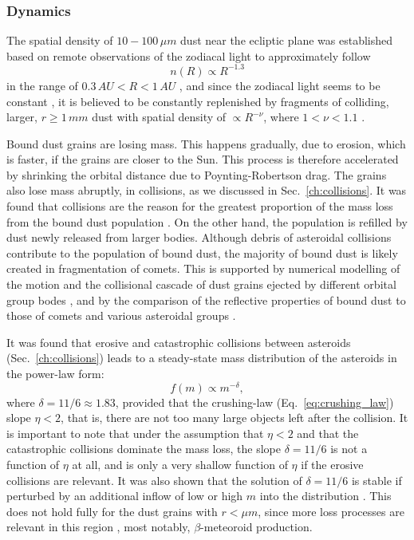 \subsubsection{Dynamics}

The spatial density of $10 - 100 \, \si{\mu m}$ dust near the ecliptic plane was established based on remote observations of the zodiacal light to approximately follow 
\begin{equation}
    n(R) \propto R^{-1.3} \label{eq:dust_number_density}
\end{equation}
in the range of $0.3 \, \si{AU} < R < 1 \, \si{AU}$ \citep{leinert1981zodiacal}, and since the zodiacal light seems to be constant \citep{buffington2016measurements}, it is believed to be constantly replenished by fragments of colliding, larger, $r \geq 1 \, \si{mm}$ dust with spatial density of $\propto R^{-\nu}$, where $1 < \nu < 1.1$ \citep{leinert1983maintain}.

Bound dust grains are losing mass. This happens gradually, due to erosion, which is faster, if the grains are closer to the Sun. This process is therefore accelerated by shrinking the orbital distance due to Poynting-Robertson drag. The grains also lose mass abruptly, in collisions, as we discussed in Sec.~\ref{ch:collisions}. It was found that collisions are the reason for the greatest proportion of the mass loss from the bound dust population \citep{grun1985collisional}. On the other hand, the population is refilled by dust newly released from larger bodies. Although debris of asteroidal collisions contribute to the population of bound dust, the majority of bound dust is likely created in fragmentation of comets. This is supported by numerical modelling of the motion and the collisional cascade of dust grains ejected by different orbital group bodes \citep{nesvorny2010cometary}, and by the comparison of the reflective properties of bound dust to those of comets and various asteroidal groups \citep{yang2015origin}. 

It was found \citep{dohnanyi1969collisional} that erosive and catastrophic collisions between asteroids (Sec.~\ref{ch:collisions}) leads to a steady-state mass distribution of the asteroids in the power-law form: 
\begin{equation}
    f(m) \propto m^{-\delta}, \label{eq:mass_distribution}
\end{equation}
where $\delta = 11/6 \approx 1.83$, provided that the crushing-law (Eq.~\ref{eq:crushing_law}) slope $\eta < 2$, that is, there are not too many large objects left after the collision. It is important to note that under the assumption that $\eta < 2$ and that the catastrophic collisions dominate the mass loss, the slope $\delta = 11/6$ is not a function of $\eta$ at all, and is only a very shallow function of $\eta$ if the erosive collisions are relevant. It was also shown that the solution of $\delta = 11/6$ is stable if perturbed by an additional inflow of low or high $m$ into the distribution \citep{dohnanyi1969collisional}. This does not hold fully for the dust grains with $r < \si{\mu m}$, since more loss processes are relevant in this region \citep{grun1985collisional}, most notably, $\beta$-meteoroid production.

